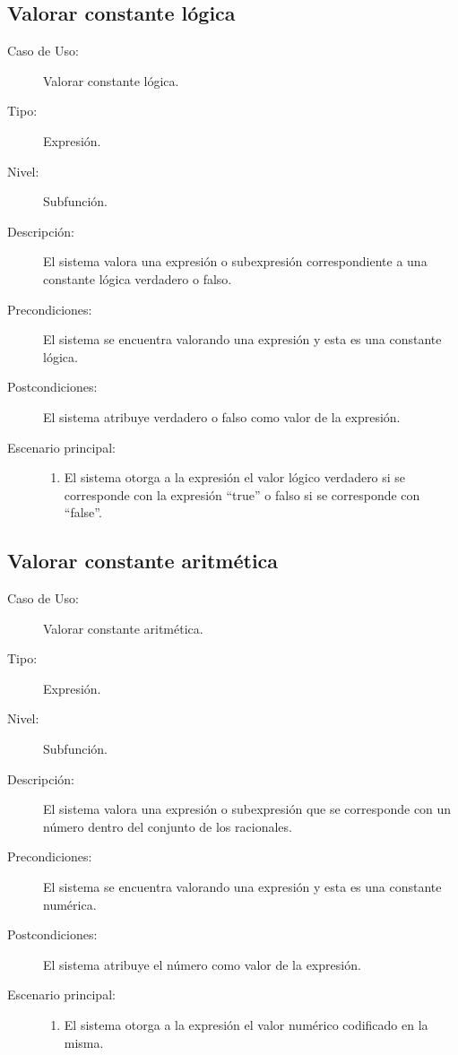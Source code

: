 \subsection{Valorar constante lógica}
\begin{framed}
\FloatBarrier
\begin{description}
   \item[Caso de Uso:]  Valorar constante lógica.
   \item [Tipo:] Expresión.
   \item[Nivel:]  Subfunción.
   \item[Descripción:] 
   El sistema valora una expresión o subexpresión correspondiente
   a una constante lógica verdadero o falso.
   \item[Precondiciones:] 
   El sistema se encuentra valorando una expresión y esta es una constante lógica.
   \item[Postcondiciones:] 
   El sistema atribuye verdadero o falso como valor de la expresión.
   \item[Escenario principal:] \hfill
   \begin{enumerate}
   \item El sistema otorga a la expresión el valor lógico verdadero 
   si se corresponde con la expresión ``true'' o falso si se corresponde 
   con ``false''.
   \end{enumerate}
\end{description}
 \FloatBarrier
\end{framed}

\subsection{Valorar constante aritmética}
\begin{framed}
\FloatBarrier
\begin{description}
   \item[Caso de Uso:]  Valorar constante aritmética.
   \item [Tipo:] Expresión.
   \item[Nivel:]  Subfunción.
   \item[Descripción:] 
   El sistema valora una expresión o subexpresión que se corresponde con
   un número dentro del conjunto de los racionales.
   \item[Precondiciones:] 
   El sistema se encuentra valorando una expresión y esta es una constante numérica.
   \item[Postcondiciones:] 
   El sistema atribuye el número como valor de la expresión.
   \item[Escenario principal:] \hfill
   \begin{enumerate}
   \item El sistema otorga a la expresión el valor numérico codificado 
   en la misma.
   \end{enumerate}
\end{description}
 \FloatBarrier
\end{framed}

